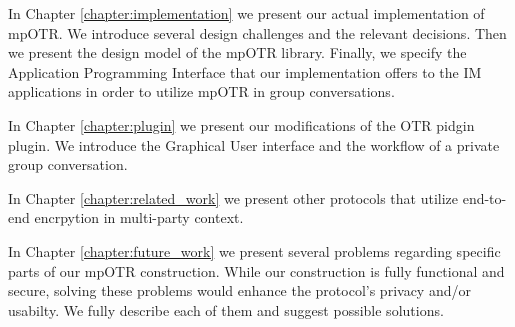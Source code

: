 In Chapter \ref{chapter:implementation} we present our actual implementation of mpOTR. We introduce  several design challenges and the relevant decisions. Then we present the design model of the mpOTR library. Finally, we specify the Application Programming Interface that our implementation offers to the IM applications in order to utilize mpOTR in group conversations.

In Chapter \ref{chapter:plugin} we present our modifications of the OTR pidgin plugin. We introduce the Graphical User interface and the workflow of a private group conversation.

In Chapter \ref{chapter:related_work} we present other protocols that utilize end-to-end encrpytion in multi-party context.

In Chapter \ref{chapter:future_work} we present several problems regarding specific parts of our mpOTR construction. While our construction is fully functional and secure, solving these problems would enhance the protocol’s privacy and/or usabilty. We fully describe each of them and suggest possible solutions.
